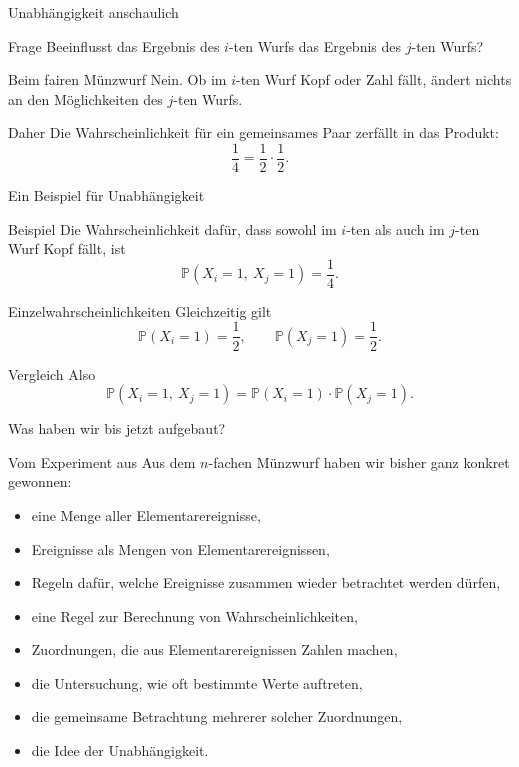 \documentclass{beamer}
\begin{document}
\begin{frame}{Unabhängigkeit anschaulich}
\begin{block}{Frage}
Beeinflusst das Ergebnis des \(i\)-ten Wurfs das Ergebnis des \(j\)-ten Wurfs?
\end{block}

\begin{block}{Beim fairen Münzwurf}
Nein. Ob im \(i\)-ten Wurf Kopf oder Zahl fällt, ändert nichts an den Möglichkeiten
des \(j\)-ten Wurfs.
\end{block}

\begin{block}{Daher}
Die Wahrscheinlichkeit für ein gemeinsames Paar zerfällt in das Produkt:
\[
\frac14=\frac12\cdot\frac12.
\]
\end{block}
\end{frame}

\begin{frame}{Ein Beispiel für Unabhängigkeit}
\begin{block}{Beispiel}
Die Wahrscheinlichkeit dafür, dass sowohl im \(i\)-ten als auch im \(j\)-ten Wurf Kopf fällt, ist
\[
\mathbb P(X_i=1,\ X_j=1)=\frac14.
\]
\end{block}

\begin{block}{Einzelwahrscheinlichkeiten}
Gleichzeitig gilt
\[
\mathbb P(X_i=1)=\frac12,\qquad \mathbb P(X_j=1)=\frac12.
\]
\end{block}

\begin{block}{Vergleich}
Also
\[
\mathbb P(X_i=1,\ X_j=1)=\mathbb P(X_i=1)\cdot\mathbb P(X_j=1).
\]
\end{block}
\end{frame}

\begin{frame}{Was haben wir bis jetzt aufgebaut?}
\begin{block}{Vom Experiment aus}
Aus dem \(n\)-fachen Münzwurf haben wir bisher ganz konkret gewonnen:
\begin{itemize}
    \item eine Menge aller Elementarereignisse,
    \item Ereignisse als Mengen von Elementarereignissen,
    \item Regeln dafür, welche Ereignisse zusammen wieder betrachtet werden dürfen,
    \item eine Regel zur Berechnung von Wahrscheinlichkeiten,
    \item Zuordnungen, die aus Elementarereignissen Zahlen machen,
    \item die Untersuchung, wie oft bestimmte Werte auftreten,
    \item die gemeinsame Betrachtung mehrerer solcher Zuordnungen,
    \item die Idee der Unabhängigkeit.
\end{itemize}
\end{block}
\end{frame}
\end{document}
